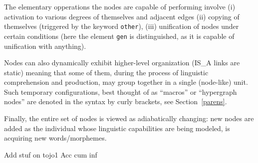 \documentclass[11pt,bookmarks,bookmarksnumbered,naturalnames,plainpages=false,pdftex,colorlinks=true,urlcolor=blue,bookmarksdepth=subsection,plainpages=false]{paper}
\begin{document}
The elementary opperations the nodes are capable of performing involve (i)
activation to various degrees of themselves and adjacent edges (ii) copying of
themselves (triggered by the keyword {\tt other}), (iii) unification of
nodes under certain conditions (here the element {\tt gen} is
distinguished, as it is capable of unification with anything).

Nodes can also dynamically exhibit higher-level organization (IS\_A links are
static) meaning that some of them, during the process of linguistic
comprehension and production, may group together in a single (node-like)
unit. Such temporary configurations, best thought of as ``macros'' or
``hypergraph nodes'' are denoted in the syntax by curly brackets, see
Section~\ref{parens}.

Finally, the entire set of nodes is viewed as adiabatically changing: new
nodes are added as the individual whose linguistic capabilities are being
modeled, is acquiring new words/morphemes. 



Add stuf on tojo1
Acc cum inf


\printbibliography
\end{document}
